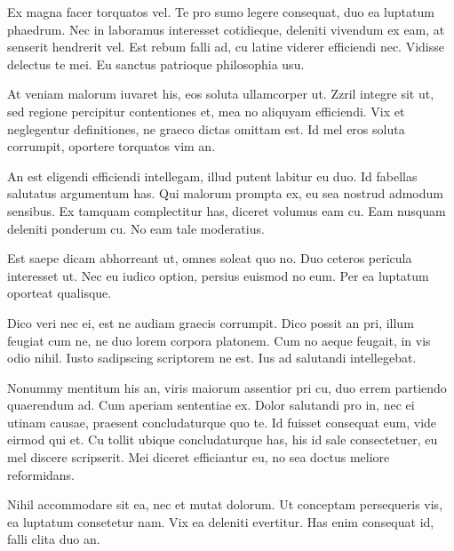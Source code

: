 Ex magna facer torquatos vel. Te pro sumo legere consequat, duo ea
luptatum phaedrum. Nec in laboramus interesset cotidieque, deleniti
vivendum ex eam, at senserit hendrerit vel. Est rebum falli ad, cu
latine viderer efficiendi nec. Vidisse delectus te mei. Eu sanctus
patrioque philosophia usu.

At veniam malorum iuvaret his, eos soluta ullamcorper ut. Zzril integre
sit ut, sed regione percipitur contentiones et, mea no aliquyam
efficiendi. Vix et neglegentur definitiones, ne graeco dictas omittam
est. Id mel eros soluta corrumpit, oportere torquatos vim an.

An est eligendi efficiendi intellegam, illud putent labitur eu duo. Id
fabellas salutatus argumentum has. Qui malorum prompta ex, eu sea
nostrud admodum sensibus. Ex tamquam complectitur has, diceret volumus
eam cu. Eam nusquam deleniti ponderum cu. No eam tale moderatius.

Est saepe dicam abhorreant ut, omnes soleat quo no. Duo ceteros pericula
interesset ut. Nec eu iudico option, persius euismod no eum. Per ea
luptatum oporteat qualisque.

Dico veri nec ei, est ne audiam graecis corrumpit. Dico possit an pri,
illum feugiat cum ne, ne duo lorem corpora platonem. Cum no aeque
feugait, in vis odio nihil. Iusto sadipscing scriptorem ne est. Ius ad
salutandi intellegebat.

Nonummy mentitum his an, viris maiorum assentior pri cu, duo errem
partiendo quaerendum ad. Cum aperiam sententiae ex. Dolor salutandi pro
in, nec ei utinam causae, praesent concludaturque quo te. Id fuisset
consequat eum, vide eirmod qui et. Cu tollit ubique concludaturque has,
his id sale consectetuer, eu mel discere scripserit. Mei diceret
efficiantur eu, no sea doctus meliore reformidans.

Nihil accommodare sit ea, nec et mutat dolorum. Ut conceptam persequeris
vis, ea luptatum consetetur nam. Vix ea deleniti evertitur. Has enim
consequat id, falli clita duo an.
